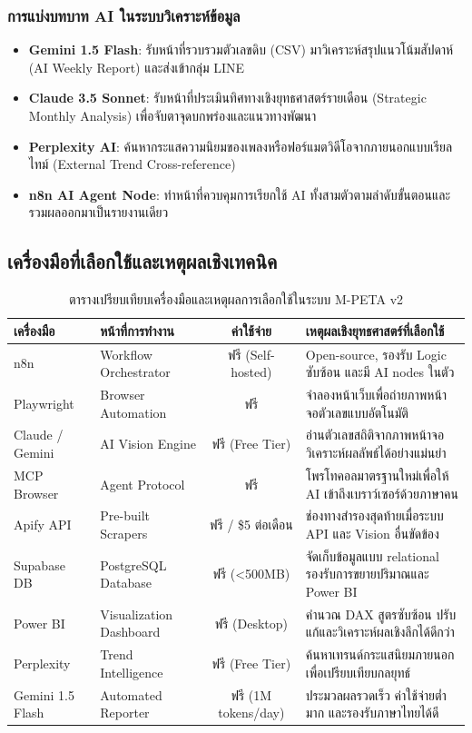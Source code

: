 \documentclass[10pt,a4paper]{article}
\begin{document}
\subsubsection{การแบ่งบทบาท AI ในระบบวิเคราะห์ข้อมูล}
\begin{itemize}
  \item \textbf{Gemini 1.5 Flash}: รับหน้าที่รวบรวมตัวเลขดิบ (CSV) มาวิเคราะห์สรุปแนวโน้มสัปดาห์ (AI Weekly Report) และส่งเข้ากลุ่ม LINE
  \item \textbf{Claude 3.5 Sonnet}: รับหน้าที่ประเมินทิศทางเชิงยุทธศาสตร์รายเดือน (Strategic Monthly Analysis) เพื่อจับตาจุดบกพร่องและแนวทางพัฒนา
  \item \textbf{Perplexity AI}: ค้นหากระแสความนิยมของเพลงหรือฟอร์แมตวิดีโอจากภายนอกแบบเรียลไทม์ (External Trend Cross-reference)
  \item \textbf{n8n AI Agent Node}: ทำหน้าที่ควบคุมการเรียกใช้ AI ทั้งสามตัวตามลำดับขั้นตอนและรวมผลออกมาเป็นรายงานเดียว
\end{itemize}

\subsection{เครื่องมือที่เลือกใช้และเหตุผลเชิงเทคนิค}
\begin{table}[h!]
  \centering
  \caption{\chulafont ตารางเปรียบเทียบเครื่องมือและเหตุผลการเลือกใช้ในระบบ M-PETA v2}
  \begin{tabular}{llcp{7.0cm}}
    \toprule
    \textbf{เครื่องมือ} & \textbf{หน้าที่การทำงาน} & \textbf{ค่าใช้จ่าย} & \textbf{เหตุผลเชิงยุทธศาสตร์ที่เลือกใช้} \\
    \midrule
    n8n & Workflow Orchestrator & ฟรี (Self-hosted) & Open-source, รองรับ Logic ซับซ้อน และมี AI nodes ในตัว \\
    Playwright & Browser Automation & ฟรี & จำลองหน้าเว็บเพื่อถ่ายภาพหน้าจอตัวเลขแบบอัตโนมัติ \\
    Claude / Gemini & AI Vision Engine & ฟรี (Free Tier) & อ่านตัวเลขสถิติจากภาพหน้าจอวิเคราะห์ผลลัพธ์ได้อย่างแม่นยำ \\
    MCP Browser & Agent Protocol & ฟรี & โพรโทคอลมาตรฐานใหม่เพื่อให้ AI เข้าถึงเบราว์เซอร์ด้วยภาษาคน \\
    Apify API & Pre-built Scrapers & ฟรี / \$5 ต่อเดือน & ช่องทางสำรองสุดท้ายเมื่อระบบ API และ Vision อื่นขัดข้อง \\
    Supabase DB & PostgreSQL Database & ฟรี (<500MB) & จัดเก็บข้อมูลแบบ relational รองรับการขยายปริมาณและ Power BI \\
    Power BI & Visualization Dashboard & ฟรี (Desktop) & คำนวณ DAX สูตรซับซ้อน ปรับแก้และวิเคราะห์ผลเชิงลึกได้ดีกว่า \\
    Perplexity & Trend Intelligence & ฟรี (Free Tier) & ค้นหาเทรนด์กระแสนิยมภายนอกเพื่อเปรียบเทียบกลยุทธ์ \\
    Gemini 1.5 Flash & Automated Reporter & ฟรี (1M tokens/day) & ประมวลผลรวดเร็ว ค่าใช้จ่ายต่ำมาก และรองรับภาษาไทยได้ดี \\
    \bottomrule
  \end{tabular}
\end{table}
\end{document}
